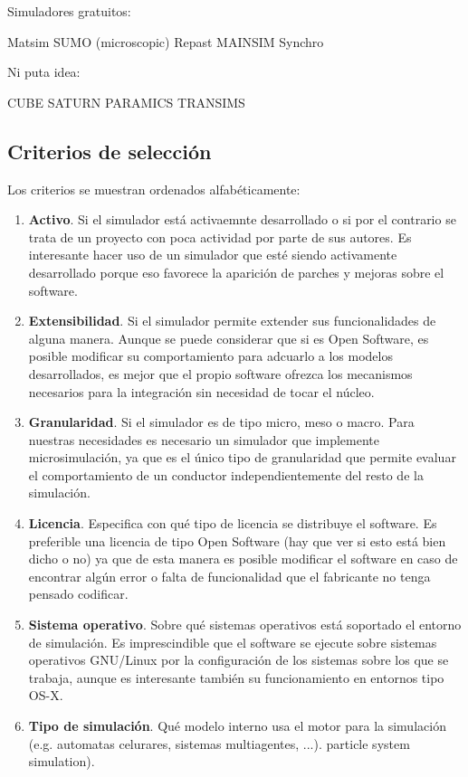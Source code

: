 Simuladores gratuitos:

Matsim
SUMO (microscopic)
Repast
MAINSIM
Synchro

Ni puta idea:

CUBE
SATURN
PARAMICS
TRANSIMS


\subsection{Criterios de selección}

Los criterios se muestran ordenados alfabéticamente:

\begin{enumerate}
	\item \textbf{Activo}. Si el simulador está activaemnte desarrollado o si por el contrario se trata de un proyecto con poca actividad por parte de sus autores. Es interesante hacer uso de un simulador que esté siendo activamente desarrollado porque eso favorece la aparición de parches y mejoras sobre el software.
	\item \textbf{Extensibilidad}. Si el simulador permite extender sus funcionalidades de alguna manera. Aunque se puede considerar que si es Open Software, es posible modificar su comportamiento para adcuarlo a los modelos desarrollados, es mejor que el propio software ofrezca los mecanismos necesarios para la integración sin necesidad de tocar el núcleo.
	\item \textbf{Granularidad}. Si el simulador es de tipo micro, meso o macro. Para nuestras necesidades es necesario un simulador que implemente microsimulación, ya que es el único tipo de granularidad que permite evaluar el comportamiento de un conductor independientemente del resto de la simulación.
	\item \textbf{Licencia}. Especifica con qué tipo de licencia se distribuye el software. Es preferible una licencia de tipo Open Software (\TODO hay que ver si esto está bien dicho o no) ya que de esta manera es posible modificar el software en caso de encontrar algún error o falta de funcionalidad que el fabricante no tenga pensado codificar.
	\item \textbf{Sistema operativo}. Sobre qué sistemas operativos está soportado el entorno de simulación. Es imprescindible que el software se ejecute sobre sistemas operativos GNU/Linux por la configuración de los sistemas sobre los que se trabaja, aunque es interesante también su funcionamiento en entornos tipo OS-X.
	\item \textbf{Tipo de simulación}. Qué modelo interno usa el motor para la simulación (e.g. automatas celurares, sistemas multiagentes, ...).
	particle system simulation).
\end{enumerate}

